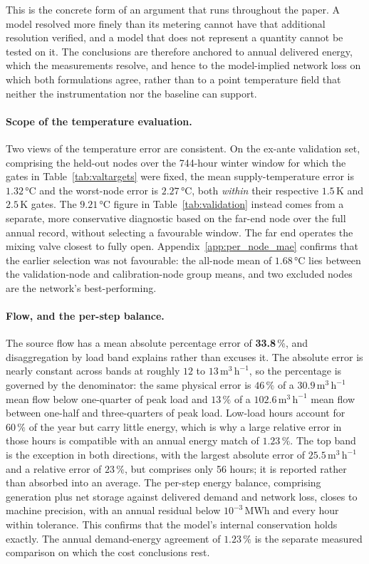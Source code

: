This is the concrete form of an argument that runs throughout the paper. A model resolved more
finely than its metering cannot have that additional resolution verified, and a model that
does not represent a quantity cannot be tested on it. The conclusions are therefore anchored
to annual delivered energy, which the measurements resolve, and hence to the model-implied
network loss on which both formulations agree, rather than to a point temperature field that
neither the instrumentation nor the baseline can support.

\paragraph{Scope of the temperature evaluation.}
Two views of the temperature error are consistent. On the ex-ante validation set, comprising
the held-out nodes over the 744-hour winter window for which the gates in
Table~\ref{tab:valtargets} were fixed, the mean supply-temperature error is \(1.32\)\,°C and
the worst-node error is \(2.27\)\,°C, both \emph{within} their respective \(1.5\)\,K and
\(2.5\)\,K gates. The \(9.21\)\,°C figure in Table~\ref{tab:validation} instead comes from a
separate, more conservative diagnostic based on the far-end node over the full annual record,
without selecting a favourable window. The far end operates the mixing valve closest to fully
open. Appendix~\ref{app:per_node_mae} confirms that the earlier selection was not favourable:
the all-node mean of \(1.68\)\,°C lies between the validation-node and calibration-node group
means, and two excluded nodes are the network's best-performing.

\paragraph{Flow, and the per-step balance.}
The source flow has a mean absolute percentage error of \textbf{33.8}\,\%, and disaggregation
by load band explains rather than excuses it. The absolute error is nearly constant across
bands at roughly \(12\) to \(13\,\mathrm{m^3\,h^{-1}}\), so the percentage is governed by
the denominator: the same physical error is \(46\,\%\) of a
\(30.9\,\mathrm{m^3\,h^{-1}}\) mean flow below one-quarter of peak load and \(13\,\%\) of a
\(102.6\,\mathrm{m^3\,h^{-1}}\) mean flow between one-half and three-quarters of peak load.
Low-load hours account for \(60\,\%\) of the year but carry little energy, which is why a
large relative error in those hours is compatible with an annual energy match of
\(1.23\,\%\). The top band is the exception in both directions, with the largest absolute
error of \(25.5\,\mathrm{m^3\,h^{-1}}\) and a relative error of \(23\,\%\), but comprises
only 56 hours; it is reported rather than absorbed into an average. The per-step energy
balance, comprising generation plus net storage against delivered demand and network loss,
closes to machine precision, with an annual residual below \(10^{-3}\,\mathrm{MWh}\) and
every hour within tolerance. This confirms that the model's internal conservation holds
exactly. The annual demand-energy agreement of \(1.23\,\%\) is the separate measured
comparison on which the cost conclusions rest.

